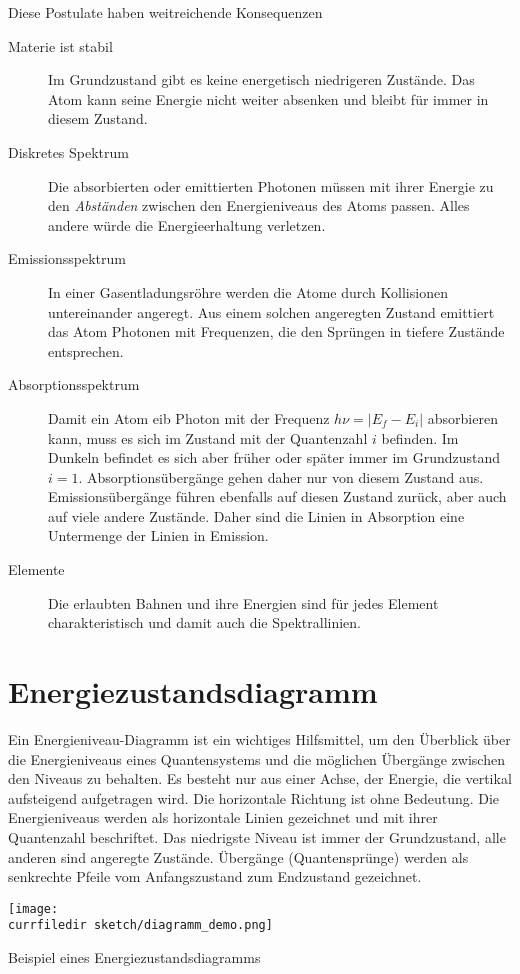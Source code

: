 Diese Postulate haben weitreichende Konsequenzen
\begin{description}
    \item[Materie ist stabil] Im Grundzustand gibt es keine energetisch niedrigeren Zustände. Das Atom kann seine Energie nicht weiter absenken und bleibt für immer in diesem Zustand.
    \item[Diskretes Spektrum] Die absorbierten oder emittierten Photonen müssen mit ihrer Energie zu den \emph{Abständen} zwischen den Energieniveaus des Atoms passen. Alles andere würde die Energieerhaltung verletzen.
    \item[Emissionsspektrum] In einer Gasentladungsröhre werden die Atome durch Kollisionen untereinander angeregt. Aus einem solchen  angeregten Zustand emittiert das Atom Photonen mit Frequenzen, die den Sprüngen in tiefere Zustände entsprechen.
    \item[Absorptionsspektrum] Damit ein Atom eib Photon mit der Frequenz $ h \nu = | E_f - E_i |$ absorbieren kann, muss es sich im Zustand mit der Quantenzahl $i$ befinden. Im Dunkeln befindet es sich aber früher oder später immer im Grundzustand $i=1$. Absorptionsübergänge gehen daher nur von diesem Zustand aus. Emissionsübergänge führen ebenfalls auf diesen Zustand zurück, aber auch auf viele andere Zustände. Daher sind die Linien in Absorption eine Untermenge der Linien in Emission.
    \item[Elemente] Die erlaubten Bahnen und ihre Energien sind für jedes Element charakteristisch und damit auch die Spektrallinien. 
\end{description}


\section{Energiezustandsdiagramm}

Ein Energieniveau-Diagramm ist ein wichtiges Hilfsmittel, um den Überblick über die Energieniveaus eines Quantensystems und die möglichen Übergänge zwischen den Niveaus zu behalten. Es besteht nur aus einer Achse, der Energie, die vertikal aufsteigend aufgetragen wird. Die horizontale Richtung ist ohne Bedeutung. Die Energieniveaus werden als horizontale Linien gezeichnet und mit ihrer Quantenzahl beschriftet. Das niedrigste Niveau ist immer der Grundzustand, alle anderen sind angeregte Zustände. Übergänge (Quantensprünge) werden als senkrechte Pfeile vom Anfangszustand zum Endzustand gezeichnet.


\begin{marginfigure}
    \texttt{[image: \\currfiledir sketch/diagramm\_demo.png]}
    \caption{Beispiel eines Energiezustandsdiagramms}
 \end{marginfigure}


